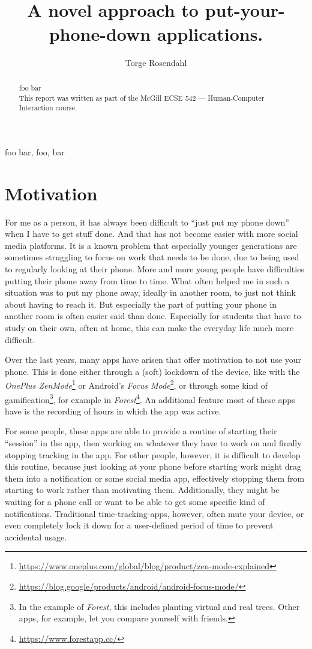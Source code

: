 \documentclass[conference]{IEEEtran}
\title{\projectname\\\Large{A novel approach to put-your-phone-down applications.}}
\author{Torge Rosendahl}
\begin{document}
\maketitle

\begin{abstract}
foo bar
\\
This report was written as part of the McGill ECSE 542 --- Human-Computer Interaction course.
\end{abstract}

\begin{IEEEkeywords}
foo bar, foo, bar
\end{IEEEkeywords}

\section{Motivation}
For me as a person, it has always been difficult to ``just put my phone down'' when I have to get stuff done. And that has not become easier with more social media platforms. It is a known problem that especially younger generations are sometimes struggling to focus on work that needs to be done, due to being used to regularly looking at their phone. More and more young people have difficulties putting their phone away from time to time. What often helped me in such a situation was to put my phone away, ideally in another room, to just not think about having to reach it. But especially the part of putting your phone in another room is often easier said than done. Especially for students that have to study on their own, often at home, this can make the everyday life much more difficult.

Over the last years, many apps have arisen that offer motivation to not use your phone. This is done either through a (soft) lockdown of the device, like with the \textit{OnePlus ZenMode}\footnote{\url{https://www.oneplus.com/global/blog/product/zen-mode-explained}} or Android's \textit{Focus Mode}\footnote{\url{https://blog.google/products/android/android-focus-mode/}}, or through some kind of gamification\footnote{In the example of \textit{Forest}, this includes planting virtual and real trees. Other apps, for example, let you compare yourself with friends.}, for example in \textit{Forest}\footnote{\url{https://www.forestapp.cc/}}. An additional feature most of these apps have is the recording of hours in which the app was active.

For some people, these apps are able to provide a routine of starting their ``session'' in the app, then working on whatever they have to work on and finally stopping tracking in the app. For other people, however, it is difficult to develop this routine, because just looking at your phone before starting work might drag them into a notification or some social media app, effectively stopping them from starting to work rather than motivating them. Additionally, they might be waiting for a phone call or want to be able to get some specific kind of notifications. Traditional time-tracking-apps, however, often mute your device, or even completely lock it down for a user-defined period of time to prevent accidental usage.
\end{document}
